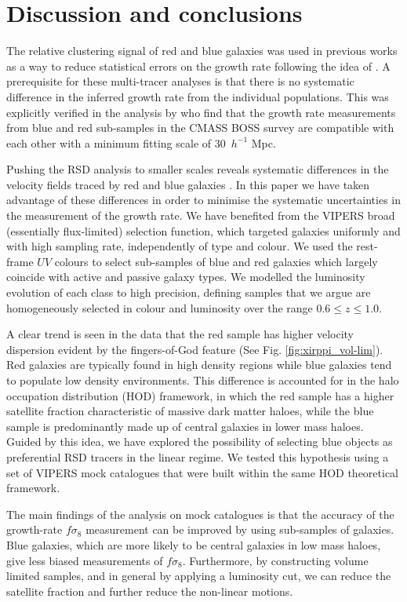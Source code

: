 \documentclass[longauth]{aa}
\newcommand{\hmpc}{$\,h^{-1}$ Mpc\xspace}
\begin{document}
\section{Discussion and conclusions}

The relative clustering signal of red and blue galaxies was used in previous works as a way to reduce  statistical errors on the growth rate \citep{blake13,ross14,pearson16} following the idea of \citet{mcdonald09}.  A prerequisite for these multi-tracer analyses is that there is no systematic difference in the inferred growth rate from the individual populations.  This was explicitly verified in the analysis by \citet{ross14} who find that the growth rate measurements from blue and red sub-samples in the CMASS BOSS survey are compatible with each other with a minimum fitting scale of 30 \hmpc.

Pushing the RSD analysis to smaller scales reveals systematic differences in the velocity fields traced by red and blue galaxies \citep{guzzo97}.  In this paper we have taken advantage of these differences in order to minimise the systematic uncertainties in the measurement of the growth rate. We have benefited from the VIPERS broad (essentially flux-limited) selection function, which targeted galaxies uniformly and with high sampling rate, independently of type and colour. We used the rest-frame $UV$ colours to select sub-samples of blue and red galaxies which largely coincide with active and passive galaxy types. We modelled the luminosity evolution of each class to high precision, defining samples that we argue are homogeneously selected in colour and luminosity over the range $0.6 \le z \le 1.0$.   

A clear trend is seen in the data that the red sample has higher velocity dispersion evident by the fingers-of-God feature (See Fig. \ref{fig:xirppi_vol-lim}).  Red galaxies are typically found in high density regions while blue galaxies tend to populate low density environments. This difference is accounted for in the halo occupation distribution (HOD) framework, in which the  red sample has a higher satellite fraction characteristic of massive dark matter haloes, while the blue sample is predominantly made up of central galaxies in lower mass haloes.  Guided by this idea, we have explored the possibility of selecting blue objects as preferential RSD tracers in the linear regime. We tested this hypothesis using a set of VIPERS mock catalogues that were built within the same HOD theoretical framework.

The main findings of the analysis on mock catalogues is that the accuracy of the growth-rate $f\sigma_8$ measurement can be improved by using sub-samples of galaxies.  Blue galaxies, which are more likely to be central galaxies in low mass haloes, give less biased measurements of $f\sigma_8$.  Furthermore, by constructing volume limited samples, and in general by applying a luminosity cut, we can reduce the satellite fraction and further reduce the non-linear motions.
\end{document}
